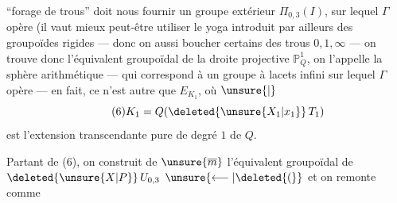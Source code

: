 ``forage de trous'' doit nous fournir un groupe extérieur $\Pi_{0,3}(I)$,  sur lequel $\Gamma$ opère (il vaut mieux peut-être utiliser le yoga introduit par ailleurs des groupoïdes rigides — donc on   aussi boucher certains des trous $0,1,\infty$ — on trouve donc l'équivalent groupoïdal de la  droite projective $\mathbb P^1_Q$, on l'appelle la sphère arithmétique — qui correspond à un groupe  à lacets infini sur lequel $\Gamma$ opère — en fait, ce n'est autre que $E_{K_1}$, où $\unsure{\vert}$
\[
\tag{6}K_1=Q(\deleted{\unsure{X_1|x_1}}\,T_1)
\]
est l'extension transcendante pure  de degré $1$ de $Q$.

Partant de (6), on construit de $\unsure{\overline m}$ l'équivalent groupoïdal de $\deleted{\unsure{X|P}}\,U_{0,3}$ $\unsure{\longleftarrow|\deleted{(}}$ et on remonte comme
